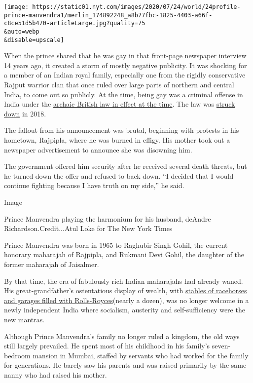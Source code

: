 \texttt{[image: https://static01.nyt.com/images/2020/07/24/world/24profile-prince-manvendra1/merlin\_174892248\_a8b77fbc-1825-4403-a66f-c8ce51d5b470-articleLarge.jpg?quality=75\\\&auto=webp\\\&disable=upscale]}

When the prince shared that he was gay in that front-page newspaper
interview 14 years ago, it created a storm of mostly negative publicity.
It was shocking for a member of an Indian royal family, especially one
from the rigidly conservative Rajput warrior clan that once ruled over
large parts of northern and central India, to come out so publicly. At
the time, being gay was a criminal offense in India under the
\href{https://www.nytimes.com/2018/06/02/world/asia/gay-in-india-where-progress-has-come-only-with-risk.html?searchResultPosition=5}{archaic
British law in effect at the time}. The law was
\href{https://www.nytimes.com/2018/09/06/world/asia/india-gay-sex-377.html}{struck
down} in 2018.

The fallout from his announcement was brutal, beginning with protests in
his hometown, Rajpipla, where he was burned in effigy. His mother took
out a newspaper advertisement to announce she was disowning him.

The government offered him security after he received several death
threats, but he turned down the offer and refused to back down. ``I
decided that I would continue fighting because I have truth on my
side,'' he said.

Image

Prince Manvendra playing the harmonium for his husband, deAndre
Richardson.Credit...Atul Loke for The New York Times

Prince Manvendra was born in 1965 to Raghubir Singh Gohil, the current
honorary maharajah of Rajpipla, and Rukmani Devi Gohil, the daughter of
the former maharajah of Jaisalmer.

By that time, the era of fabulously rich Indian maharajahs had already
waned. His great-grandfather's ostentatious display of wealth, with
\href{https://economictimes.indiatimes.com/erstwhile-royals-rally-to-bring-back-vintage-rolls-royce-sold-overseas/articleshow/20608569.cms?from=mdr}{stables
of racehorses and garages filled with Rolls-Royces}(nearly a dozen), was
no longer welcome in a newly independent India where socialism,
austerity and self-sufficiency were the new mantras.

Although Prince Manvendra's family no longer ruled a kingdom, the old
ways still largely prevailed. He spent most of his childhood in his
family's seven-bedroom mansion in Mumbai, staffed by servants who had
worked for the family for generations. He barely saw his parents and was
raised primarily by the same nanny who had raised his mother.

